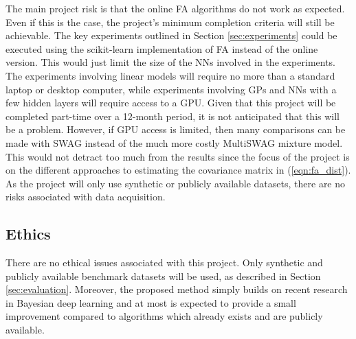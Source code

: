 \documentclass[a4paper,11pt]{article}
\begin{document}
The main project risk is that the online FA algorithms do not work as expected. 
Even if this is the case, the project's minimum completion criteria will still be achievable. The key experiments outlined in Section \ref{sec:experiments} could be executed using the scikit-learn implementation of FA instead of the online version. This would just limit the size of the NNs involved in the experiments. 
The experiments involving linear models will require no more than a standard laptop or desktop computer, while experiments involving GPs and NNs with a few hidden layers will require access to a GPU. Given that this project will be completed part-time over a 12-month period, it is not anticipated that this will be a problem. 
However, if GPU access is limited, then many comparisons can be made with SWAG instead of the much more costly MultiSWAG mixture model.  This would not detract too much from the results since the focus of the project is on the different approaches to estimating the covariance matrix in (\ref{eqn:fa_dist}). 
As the project will only use synthetic or publicly available datasets, there are no risks associated with data acquisition.

\subsection{Ethics}

There are no ethical issues associated with this project. Only synthetic and publicly available benchmark datasets will be used, as described in Section \ref{sec:evaluation}. Moreover, the proposed method simply builds on recent research in Bayesian deep learning and at most is expected to provide a small improvement compared to algorithms which already exists and are publicly available.
\end{document}
